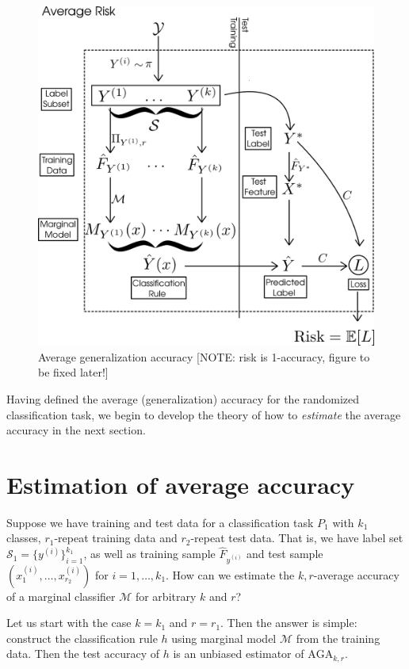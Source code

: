 \begin{figure}[h]
\centering
\includegraphics[scale = 0.3]{../extrapolation_figures/average_risk.png}
\caption{Average generalization accuracy [NOTE: risk is 1-accuracy, figure to be fixed later!]}\label{fig:average_risk}
\end{figure}

Having defined the average (generalization) accuracy for the randomized classification
task, we begin to develop the theory of how to \emph{estimate} the
average accuracy in the next section.

\section{Estimation of average accuracy}\label{sec:estimation_average_accuracy}

Suppose we have training and test data for a classification task $P_1$
with $k_1$ classes, $r_1$-repeat training data and $r_2$-repeat test
data.  That is, we have label set $\mathcal{S}_1 =
\{y^{(i)}\}_{i=1}^{k_1}$, as well as training sample $\hat{F}_{y^{(i)}}$
and test sample $(x_1^{(i)},\hdots, x_{r_2}^{(i)})$ for $i =
1,\hdots, k_1$.  How can we estimate the $k, r$-average accuracy of a
marginal classifier $\mathcal{M}$ for arbitrary $k$ and $r$?

Let us start with the case $k = k_1$ and $r = r_1$.  Then the answer
is simple: construct the classification rule $h$ using marginal model
$\mathcal{M}$ from the training data.  Then the test accuracy of $h$ is an
unbiased estimator of $\text{AGA}_{k,r}$.

